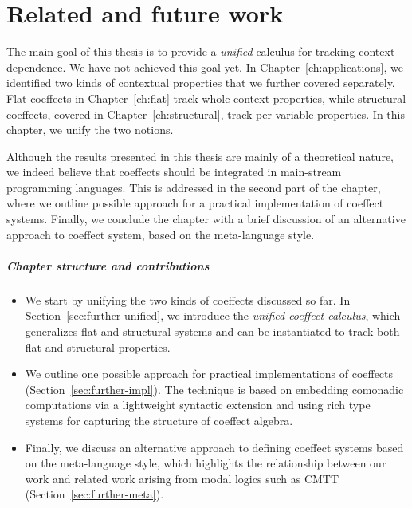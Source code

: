 \chapter{Related and future work}
\label{ch:further}


The main goal of this thesis is to provide a \emph{unified} calculus for tracking context
dependence. We have not achieved this goal yet. In Chapter~\ref{ch:applications}, we identified
two kinds of contextual properties that we further covered separately. Flat coeffects in
Chapter~\ref{ch:flat} track whole-context properties, while structural coeffects, covered in
Chapter~\ref{ch:structural}, track per-variable properties. In this chapter, we unify the two
notions.

Although the results presented in this thesis are mainly of a theoretical nature, we indeed
believe that coeffects should be integrated in main-stream programming languages. This is addressed
in the second part of the chapter, where we outline possible approach for a practical implementation
of coeffect systems. Finally, we conclude the chapter with a brief discussion of an alternative
approach to coeffect system, based on the meta-language style.

\paragraph{Chapter structure and contributions}
\begin{itemize}
\item We start by unifying the two kinds of coeffects discussed so far. In
  Section~\ref{sec:further-unified}, we introduce the \emph{unified coeffect calculus}, which
  generalizes flat and structural systems and can be instantiated to track both flat and structural
  properties.

\item We outline one possible approach for practical implementations of coeffects
  (Section~\ref{sec:further-impl}). The technique is based on embedding comonadic computations
  via a lightweight syntactic extension and using rich type systems for capturing the structure of
  coeffect algebra.

\item Finally, we discuss an alternative approach to defining coeffect systems based on the
  meta-language style, which highlights the relationship between our work and related work arising
  from modal logics such as CMTT \cite{logic-cmtt} (Section~\ref{sec:further-meta}).
\end{itemize}

